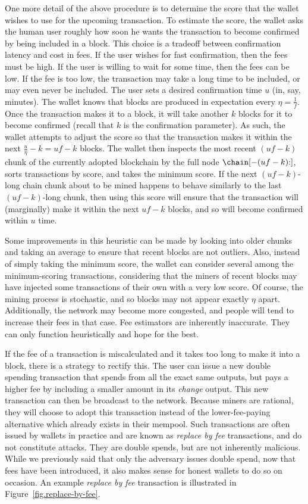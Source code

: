 One more detail of the above procedure is to determine the score that the wallet wishes
to use for the upcoming transaction. To estimate the score, the wallet asks the human
user roughly how soon he wants the transaction to become confirmed by being included in
a block. This choice is a tradeoff between confirmation latency and cost in fees.
If the user wishes for fast confirmation, then the fees must be high.
If the user is willing to wait for some time, then the fees can be low.
If the fee is too low, the transaction may take a long time to be included,
or may even never be included.
The user sets a desired confirmation time $u$ (in, say, minutes).
The wallet knows that blocks are produced in expectation every $\eta = \frac{1}{f}$.
Once the transaction makes it to a block, it will take another $k$ blocks for it
to become confirmed (recall that $k$ is the confirmation parameter).
As such, the wallet attempts to adjust the score so that the
transaction makes it within the next $\frac{u}{\eta} - k = uf - k$ blocks.
The wallet then inspects the most recent $(uf - k)$ chunk of the currently
adopted blockchain by the full node $\chain[{-(uf - k)}{:}]$, sorts transactions
by score, and takes the minimum score. If the next $(uf - k)$-long chain chunk
about to be mined happens to behave similarly to the last $(uf - k)$-long chunk, then using this score
will ensure that the transaction will (marginally) make it within the next
$uf - k$ blocks, and so will become confirmed within $u$ time.

Some improvements
in this heuristic can be made by looking into older chunks and taking an average
to ensure that recent blocks are not outliers. Also, instead of simply taking the
minimum score, the wallet can consider several among the minimum-scoring transactions,
considering that the miners of recent blocks may have injected some transactions
of their own with a very low score. Of course, the mining process is stochastic,
and so blocks may not appear exactly $\eta$ apart. Additionally, the network
may become more congested, and people will tend to increase their fees in
that case. Fee estimators are inherently inaccurate. They can only function
heuristically and hope for the best.

If the fee of a transaction is miscalculated and it takes too long to make it
into a block, there is a strategy to rectify this. The user can issue a new
double spending transaction that spends from all the exact same outputs, but
pays a higher fee by including a smaller amount in its \emph{change} output.
This new transaction can then be broadcast to the network. Because miners are
rational, they will choose to adopt this transaction instead of the lower-fee-paying
alternative which already exists in their mempool. Such transactions are often
issued by wallets in practice and are known as \emph{replace by fee}
transactions, and do not constitute attacks.
They are double spends, but are not inherently malicious.
While we previously said that only the adversary issues double spend,
now that fees have been introduced, it also makes sense for honest wallets
to do so on occasion. An example \emph{replace by fee} transaction is illustrated in
Figure~\ref{fig.replace-by-fee}.

